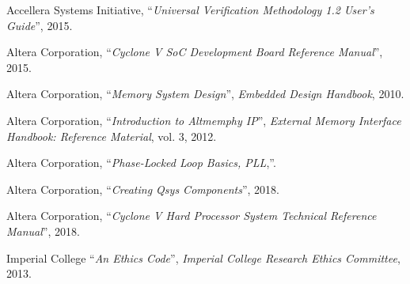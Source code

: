 \begin{thebibliography}{1}

  Accellera Systems Initiative,
  ``\textit{Universal Verification Methodology 1.2 User’s Guide}'',
  2015.

  Altera Corporation,
  ``\textit{Cyclone V SoC Development Board Reference Manual}'',
  2015.

  Altera Corporation,
  ``\textit{Memory System Design}'',
  \textit{Embedded Design Handbook},
  2010.

  Altera Corporation,
  ``\textit{Introduction to Altmemphy IP}'',
  \textit{External Memory Interface Handbook: Reference Material}, vol. 3,
  2012.

  Altera Corporation,
  ``\textit{Phase-Locked Loop Basics, PLL},''.

  Altera Corporation,
  ``\textit{Creating Qsys Components}'',
  2018.

  Altera Corporation,
  ``\textit{Cyclone V Hard Processor System Technical Reference Manual}'',
  2018.

  Imperial College
  ``\textit{An Ethics Code}'',
  \textit{Imperial College Research Ethics Committee},
  2013.


\end{thebibliography}

